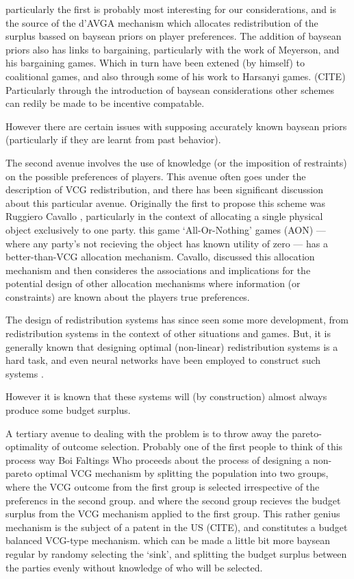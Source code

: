 particularly the first is probably most interesting for our considerations, and is the source of the d'AVGA mechanism which allocates redistribution of the surplus bassed on baysean priors on player preferences.
The addition of baysean priors also has links to bargaining, particularly with the work of Meyerson, and his bargaining games.
Which in turn have been extened (by himself) to coalitional games, and also through some of his work to Harsanyi games. (CITE)
Particularly through the introduction of baysean considerations other schemes can redily be made to be incentive compatable.

However there are certain issues with supposing accurately known baysean priors (particularly if they are learnt from past behavior).

The second avenue involves the use of knowledge (or the imposition of restraints) on the possible preferences of players.
This avenue often goes under the description of VCG redistribution, and there has been significant discussion about this particular avenue.
Originally the first to propose this scheme was Ruggiero Cavallo \cite{Cavallo:2006:ODM:1160633.1160790}, particularly in the context of allocating a single physical object exclusively to one party.
this game `All-Or-Nothing' games (AON) --- where any party's not recieving the object has known utility of zero --- has a better-than-VCG allocation mechanism.
Cavallo, discussed this allocation mechanism and then consideres the associations and implications for the potential design of other allocation mechanisms where information (or constraints) are known about the players true preferences.

The design of redistribution systems has since seen some more development, from redistribution systems in the context of other situations and games.
But, it is generally known that designing optimal (non-linear) redistribution systems is a hard task, and even neural networks have been employed to construct such systems \cite{DBLP:conf/atal/ManishaJG18}.

However it is known that these systems will (by construction) almost always produce some budget surplus.

A tertiary avenue to dealing with the problem is to throw away the pareto-optimality of outcome selection.
Probably one of the first people to think of this process way Boi Faltings \cite{10.1007/978-3-642-25510-6_14}
Who proceeds about the process of designing a non-pareto optimal VCG mechanism by splitting the population into two groups, where the VCG outcome from the first group is selected irrespective of the preferencs in the second group.
and where the second group recieves the budget surplus from the VCG mechanism applied to the first group.
This rather genius mechanism is the subject of a patent in the US (CITE), and constitutes a budget balanced VCG-type mechanism.
which can be made a little bit more baysean regular by randomy selecting the `sink', and splitting the budget surplus between the parties evenly without knowledge of who will be selected.\cite{10.1007/978-3-642-25510-6_14}

